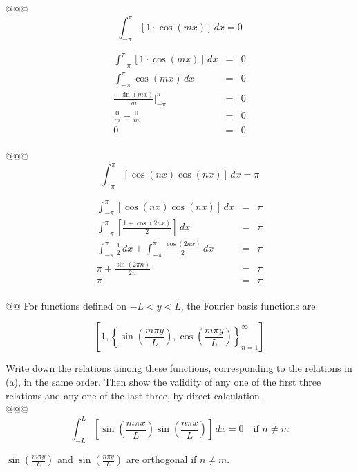 \documentclass[10pt]{article}
\begin{document}
\begin{easylist}[enumerate]
    @@@ \[ \int_{-\pi}^\pi \left[ 1 \cdot \cos(mx) \right] \, dx = 0 \]

    \begin{align*}
        \int_{-\pi}^\pi \left[ 1 \cdot \cos(mx) \right] \, dx &=& 0\\
        \int_{-\pi}^\pi \cos(mx) \, dx &=& 0\\
        \frac{-\sin(mx)}{m} \bigg|_{-\pi}^\pi &=& 0\\
        \frac{0}{m} - \frac{0}{m} &=& 0\\
        0 &=& 0\\
    \end{align*}

    @@@ \[ \int_{-\pi}^\pi \left[ \cos(nx) \cos(nx) \right] \, dx = \pi \]

    \begin{align*}
        \int_{-\pi}^\pi \left[ \cos(nx) \cos(nx) \right] \, dx &=& \pi\\
        \int_{-\pi}^\pi \left[ \frac{1 + \cos(2nx)}{2} \right] \, dx &=& \pi\\
        \int_{-\pi}^\pi \frac{1}{2} \, dx + \int_{-\pi}^\pi \frac{\cos(2nx)}{2} \, dx &=& \pi\\
        \pi + \frac{\sin (2 \pi  n)}{2 n} &=& \pi\\
        \pi &=& \pi\\
    \end{align*}

    @@ For functions defined on $-L < y < L$, the Fourier basis functions are:

    \[
        \left[
            1,
            {\left\{
                \sin \left( \frac{m \pi y}{L} \right),
                \cos \left( \frac{m \pi y}{L} \right)
            \right\}}_{n=1}^\infty
        \right]
    \]

    Write down the relations among these functions, corresponding to the relations in (a), in the same order. Then show
    the validity of any one of the first three relations and any one of the last three, by direct calculation.\\

    @@@ \[ \int_{-L}^L \left[ \sin\left(\frac{m \pi x}{L} \right) \sin\left(\frac{n \pi x}{L} \right) \right] \, dx = 0 \quad \text{if } n \neq m \]

    $\sin\left(\frac{m \pi y}{L} \right)$ and $\sin\left(\frac{n \pi y}{L} \right)$ are orthogonal if $n \neq m$.


\end{easylist}
\end{document}
